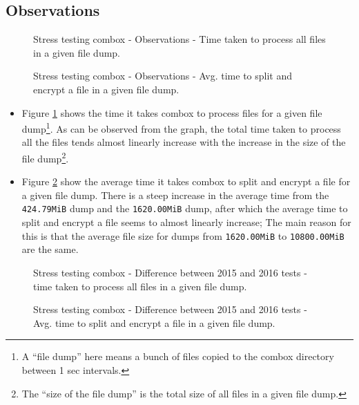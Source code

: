 \subsection{Observations}\label{4-st-o}

\begin{figure}[h]
  \centering 
  \caption{Stress testing combox - Observations - Time taken to
    process all files in a given file dump.}
  \label{fig:4-st-tt}
\end{figure}

\begin{figure}[h]
  \centering 
  \caption{Stress testing combox - Observations - Avg. time to split
    and encrypt a file in a given file dump.}
  \label{fig:4-st-atsae}
\end{figure}


\begin{itemize}
\item Figure \ref{fig:4-st-tt} shows the time it takes combox to
  process files for a given file dump\footnote{A ``file dump'' here
    means a bunch of files copied to the combox directory between 1
    sec intervals.}. As can be observed from the graph, the total time
  taken to process all the files tends almost linearly increase with
  the increase in the size of the file dump\footnote{The ``size of the
    file dump'' is the total size of all files in a given file dump.}.
\item Figure \ref{fig:4-st-atsae} show the average time it takes
  combox to split and encrypt a file for a given file dump. There is a
  steep increase in the average time from the \verb+424.79MiB+ dump
  and the \verb+1620.00MiB+ dump, after which the average time to
  split and encrypt a file seems to almost linearly increase; The main
  reason for this is that the average file size for dumps from
  \verb+1620.00MiB+ to \verb+10800.00MiB+ are the same.
\end{itemize}

\begin{figure}[h]
  \centering 
  \caption{Stress testing combox - Difference between 2015 and 2016
    tests - time taken to process all files in a given file dump.}
  \label{fig:4-st-tt-diff}
\end{figure}

\begin{figure}[h]
  \centering 
  \caption{Stress testing combox - Difference between 2015 and 2016
    tests - Avg. time to split and encrypt a file in a given file
    dump.}
  \label{fig:4-st-atsae-diff}
\end{figure}

